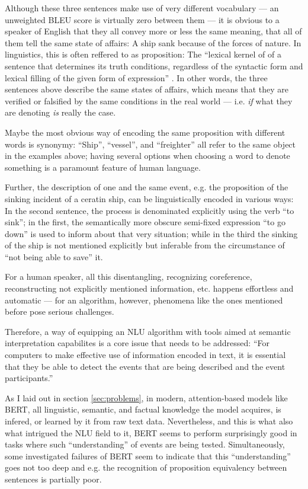 Although these three sentences make use of very different vocabulary --- an unweighted BLEU score
is virtually zero between them --- it is obvious to a speaker of English that they all convey more
or less the same meaning, that all of them tell the same state of affairs: A ship sank because
of the forces of nature. In linguistics, this is often reffered to as proposition: The ``lexical
kernel of of a sentence that determines its truth conditions, regardless of the syntactic form and
lexical filling of the given form of expression'' \cite[p.~959]{bussmann2006routledge}. In other
words, the three sentences above describe the same states of affairs, which means that they are
verified or falsified by the same conditions in the real world --- i.e. \emph{if} what they are
denoting \emph{is} really the case.

Maybe the most obvious way of encoding the same proposition with different words is
synonymy: ``Ship'', ``vessel'', and ``freighter'' all refer to the same object in the
examples above; having several options when choosing a word to denote something is a
paramount feature of human language.

Further, the description of one and the same event, e.g. the proposition of the sinking incident
of a ceratin ship, can be linguistically encoded in various ways: In the second sentence, the
process is denominated explicitly using the verb ``to sink''; in the first, the semantically more
obscure semi-fixed expression ``to go down'' is used to inform about that very situation; while in
the third the sinking of the ship is not mentioned explicitly but inferable from the circumstance
of ``not being able to save'' it.

For a human speaker, all this disentangling, recognizing coreference, reconstructing
not explicitly mentioned information, etc. happens effortless and automatic --- for an
algorithm, however, phenomena like the ones mentioned before pose serious challenges.

Therefore, a way of equipping an NLU algorithm with tools aimed at semantic interpretation
capabilites is a core issue that needs to be addressed: ``For computers to make effective
use of information encoded in text, it is essential that they be able to detect the events
that are being described and the event participants.'' \citep{palmer2010semantic}

As I laid out in section \ref{sec:problems}, in modern, attention-based models like BERT,
all linguistic, semantic, and factual knowledge the model acquires, is infered, or learned
by it from raw text data. Nevertheless, and this is what also what intrigued the NLU field
to it, BERT seems to perform surprisingly good in tasks where such ``understanding'' of
events are being tested. Simultaneously, some investigated failures of BERT seem
to indicate that this ``understanding'' goes not too deep and e.g. the recognition of
proposition equivalency between sentences is partially poor.

